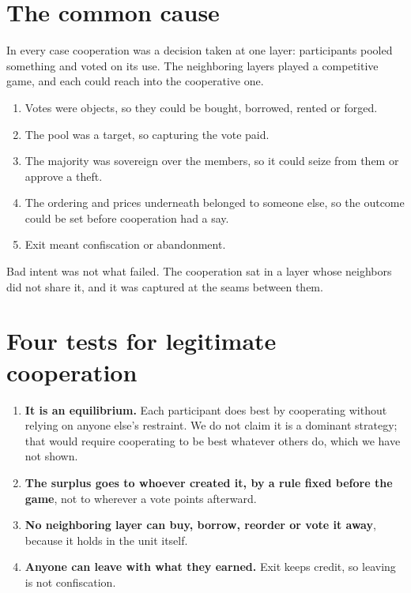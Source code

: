 \documentclass[11pt]{article}
\begin{document}
\section{The common cause}

In every case cooperation was a decision taken at one layer: participants pooled something and voted on its use. The neighboring layers played a competitive game, and each could reach into the cooperative one.

\begin{enumerate}
\item Votes were objects, so they could be bought, borrowed, rented or forged.
\item The pool was a target, so capturing the vote paid.
\item The majority was sovereign over the members, so it could seize from them or approve a theft.
\item The ordering and prices underneath belonged to someone else, so the outcome could be set before cooperation had a say.
\item Exit meant confiscation or abandonment.
\end{enumerate}

\noindent Bad intent was not what failed. The cooperation sat in a layer whose neighbors did not share it, and it was captured at the seams between them.

\section{Four tests for legitimate cooperation}

\begin{enumerate}
\item \textbf{It is an equilibrium.} Each participant does best by cooperating without relying on anyone else's restraint. We do not claim it is a dominant strategy; that would require cooperating to be best whatever others do, which we have not shown.
\item \textbf{The surplus goes to whoever created it, by a rule fixed before the game}, not to wherever a vote points afterward.
\item \textbf{No neighboring layer can buy, borrow, reorder or vote it away}, because it holds in the unit itself.
\item \textbf{Anyone can leave with what they earned.} Exit keeps credit, so leaving is not confiscation.
\end{enumerate}
\end{document}
